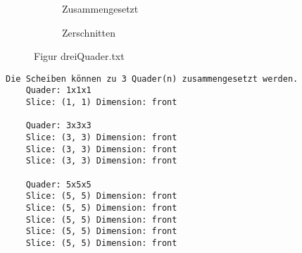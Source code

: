 \documentclass[a4paper,10pt,ngerman]{scrartcl}
\newcommand{\simplecube}[8]%
{
    \begin{scope}[shift={#1}]
        \fill[gray!40,canvas is yz plane at x=#2, opacity=#8] (0,0) rectangle (#3,#4);
        \fill[gray!10,canvas is xz plane at y=#3, opacity=#8] (0,0) rectangle (#2,#4);
        \fill[white  ,canvas is xy plane at z=#4, opacity=#8] (0,0) rectangle (#2,#3);
        \foreach\i/\j in {0/1, 1/1, 1/0}
            {
            \draw[line#5] (0,#3*\i,#4*\j) --++ (#2,0,0);
            \draw[line#6] (#2*\i,0,#4*\j) --++ (0,#3,0);
            \draw[line#7] (#2*\i,#3*\j,0) --++ (0,0,#4);
        }
    \end{scope}
}
\begin{document}
\begin{figure}[H]
\begin{subfigure}[b]{0.45\textwidth}
\begin{tikzpicture}[3d view={115}{30},line cap=round,line join=round,scale=0.4]
            \end{tikzpicture}
            \caption{Zusammengesetzt}\label{fig:figA4}
        \end{subfigure}
        \begin{subfigure}[b]{0.45\textwidth}
            \centering %
            \caption{Zerschnitten}\label{fig:figB4}
        \end{subfigure}
        \caption{Figur dreiQuader.txt}\label{fig:figAB4}
    \end{figure}

    \begin{lstlisting}[frame=single, title=Programmausgabe dreiQuader.txt, breaklines=true,label={lst:lstlisting5}]
    Die Scheiben können zu 3 Quader(n) zusammengesetzt werden.
    Quader: 1x1x1
    Slice: (1, 1) Dimension: front

    Quader: 3x3x3
    Slice: (3, 3) Dimension: front
    Slice: (3, 3) Dimension: front
    Slice: (3, 3) Dimension: front

    Quader: 5x5x5
    Slice: (5, 5) Dimension: front
    Slice: (5, 5) Dimension: front
    Slice: (5, 5) Dimension: front
    Slice: (5, 5) Dimension: front
    Slice: (5, 5) Dimension: front
    \end{lstlisting}
\end{document}
